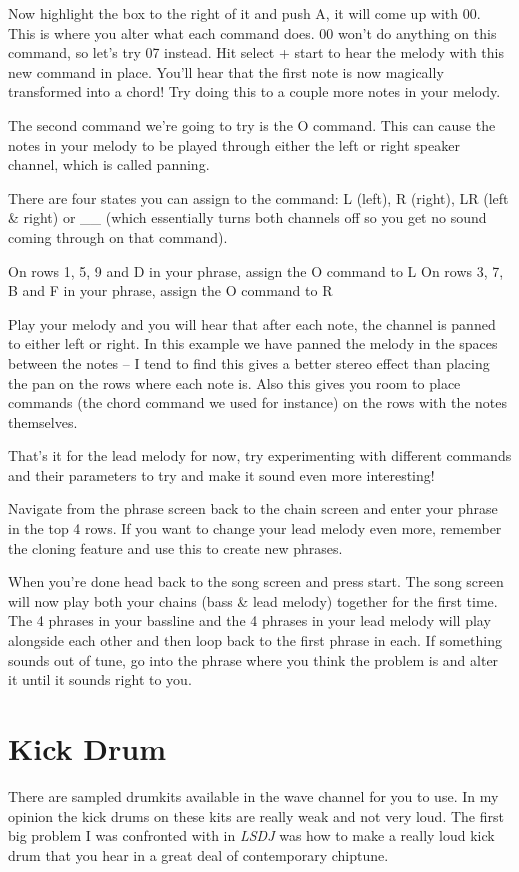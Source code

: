 \documentclass[]{article}
\newcommand{\lsdj}{\textit{LSDJ}\xspace}
\begin{document}
Now highlight the box to the right of it and push A, it will come up with 00. This is where you alter what each command does. 00 won't do anything on this command, so let's try 07 instead. Hit select + start to hear the melody with this new command in place. You'll hear that the first note is now magically transformed into a chord! Try doing this to a couple more notes in your melody.

The second command we're going to try is the O command. This can cause the notes in your melody to be played through either the left or right speaker channel, which is called panning.

There are four states you can assign to the command: L (left), R (right), LR (left \& right) or \_\_ (which essentially turns both channels off so you get no sound coming through on that command).

On rows 1, 5, 9 and D in your phrase, assign the O command to L On rows 3, 7, B and F in your phrase, assign the O command to R

Play your melody and you will hear that after each note, the channel is panned to either left or right. In this example we have panned the melody in the spaces between the notes – I tend to find this gives a better stereo effect than placing the pan on the rows where each note is. Also this gives you room to place commands (the chord command we used for instance) on the rows with the notes themselves.

That's it for the lead melody for now, try experimenting with different commands and their parameters to try and make it sound even more interesting!

Navigate from the phrase screen back to the chain screen and enter your phrase in the top 4 rows. If you want to change your lead melody even more, remember the cloning feature and use this to create new phrases.

When you're done head back to the song screen and press start. The song screen will now play both your chains (bass \& lead melody) together for the first time. The 4 phrases in your bassline and the 4 phrases in your lead melody will play alongside each other and then loop back to the first phrase in each. If something sounds out of tune, go into the phrase where you think the problem is and alter it until it sounds right to you.

\section{Kick Drum}
There are sampled drumkits available in the wave channel for you to use. In my opinion the kick drums on these kits are really weak and not very loud. The first big problem I was confronted with in \lsdj was how to make a really loud kick drum that you hear in a great deal of contemporary chiptune.
\end{document}

